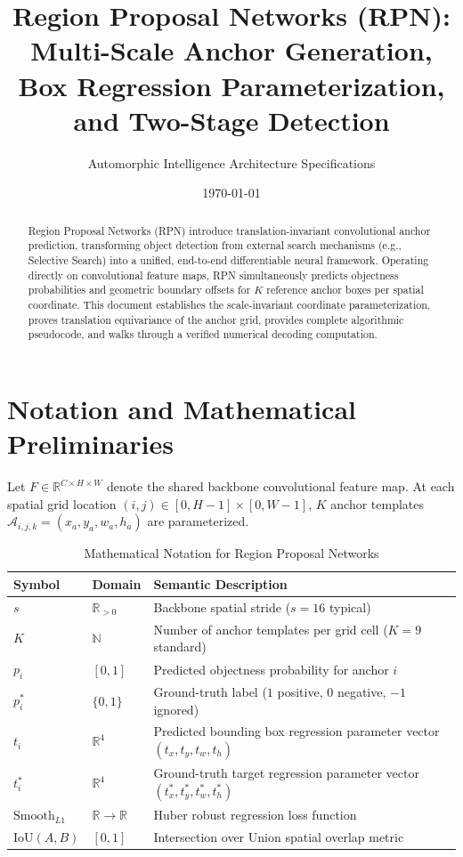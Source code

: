 \documentclass[11pt,a4paper]{article}
\title{Region Proposal Networks (RPN): Multi-Scale Anchor Generation, Box Regression Parameterization, and Two-Stage Detection}
\author{Automorphic Intelligence Architecture Specifications}
\date{\today}
\theoremstyle{definition}
\begin{document}
\maketitle

\begin{abstract}
Region Proposal Networks (RPN) introduce translation-invariant convolutional anchor prediction, transforming object detection from external search mechanisms (e.g., Selective Search) into a unified, end-to-end differentiable neural framework. Operating directly on convolutional feature maps, RPN simultaneously predicts objectness probabilities and geometric boundary offsets for $K$ reference anchor boxes per spatial coordinate. This document establishes the scale-invariant coordinate parameterization, proves translation equivariance of the anchor grid, provides complete algorithmic pseudocode, and walks through a verified numerical decoding computation.
\end{abstract}

\section{Notation and Mathematical Preliminaries}

Let $F \in \mathbb{R}^{C \times H \times W}$ denote the shared backbone convolutional feature map. At each spatial grid location $(i, j) \in [0, H-1] \times [0, W-1]$, $K$ anchor templates $\mathcal{A}_{i,j,k} = (x_a, y_a, w_a, h_a)$ are parameterized.

\begin{table}[h]
\centering
\caption{Mathematical Notation for Region Proposal Networks}
\begin{tabular}{lll}
\toprule
\textbf{Symbol} & \textbf{Domain} & \textbf{Semantic Description} \\
\midrule
$s$ & $\mathbb{R}_{> 0}$ & Backbone spatial stride ($s = 16$ typical) \\
$K$ & $\mathbb{N}$ & Number of anchor templates per grid cell ($K = 9$ standard) \\
$p_i$ & $[0, 1]$ & Predicted objectness probability for anchor $i$ \\
$p_i^*$ & $\{0, 1\}$ & Ground-truth label ($1$ positive, $0$ negative, $-1$ ignored) \\
$t_i$ & $\mathbb{R}^4$ & Predicted bounding box regression parameter vector $(t_x, t_y, t_w, t_h)$ \\
$t_i^*$ & $\mathbb{R}^4$ & Ground-truth target regression parameter vector $(t_x^*, t_y^*, t_w^*, t_h^*)$ \\
$\text{Smooth}_{L1}$ & $\mathbb{R} \to \mathbb{R}$ & Huber robust regression loss function \\
$\text{IoU}(A, B)$ & $[0, 1]$ & Intersection over Union spatial overlap metric \\
\bottomrule
\end{tabular}
\end{table}
\end{document}
